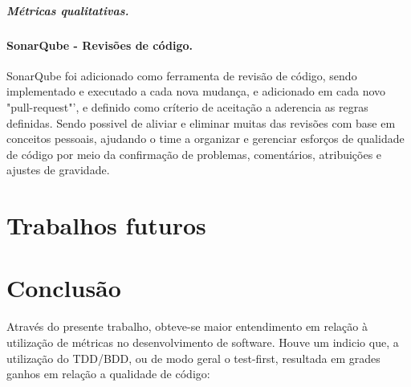 \documentclass[12pt]{article}
\begin{document}
\subsubsection{Métricas qualitativas.} \label{sec:sonar-planning-mquality}


\subsection{SonarQube - Revisões de código.} \label{sec:sonar-review}

SonarQube foi adicionado como ferramenta de revisão de código, sendo implementado e executado a cada nova mudança, e adicionado em cada novo "pull-request"', e definido como críterio de aceitação a aderencia as regras definidas.
Sendo possivel de aliviar e eliminar muitas das revisões com base em conceitos pessoais, ajudando o time a organizar e gerenciar esforços de qualidade de código por meio da confirmação de problemas, comentários, atribuições e ajustes de gravidade. 

\part{Trabalhos futuros} \label{sec:trabalhos_futuros}

\part{Conclusão} \label{sec:conclusao}

Através do presente trabalho, obteve-se maior entendimento em relação à utilização de métricas no desenvolvimento de software.
Houve um indicio que, a utilização do TDD/BDD, ou de modo geral o test-first, resultada em grades ganhos em relação a qualidade de código:
\end{document}
